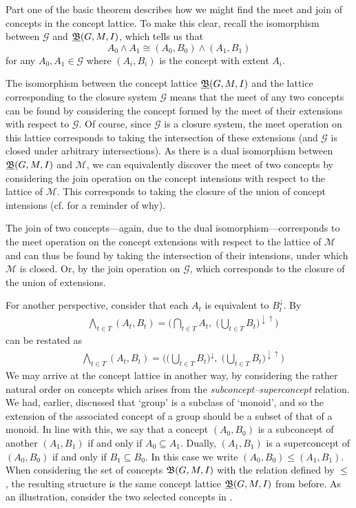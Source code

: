 Part one of the basic theorem describes how we might find the meet and join of concepts in the concept lattice. To make this
clear, recall the isomorphism between $\mathcal{G}$ and $\underline{{\mathfrak B}} (G,M,\mathrel{I})$, which tells us that
\[
	A_{0}\wedge A_{1}\cong (A_{0},B_{0}) \wedge (A_{1},B_{1})
\]
for any $A_{0},A_{1}\in \mathcal{G}$ where $(A_{i},B_{i})$ is the concept with extent $A_{i}$.

The isomorphism between the concept lattice $\underline{{\mathfrak B}} (G,M,\mathrel{I})$ and the lattice corresponding to the closure system $\mathcal{G}$ means
that the meet of any two concepts can be found by considering the concept formed by the meet of their extensions with respect
to $\mathcal{G}$. Of course, since $\mathcal{G}$ is a closure system, the meet operation on this lattice corresponds to
taking the intersection of these extensions (and $\mathcal{G}$ is closed under arbitrary intersections). As there is a dual
isomorphism between $\underline{{\mathfrak B}} (G,M,\mathrel{I})$ and $\mathcal{M}$, we can equivalently discover the meet of two concepts by considering the
join operation on the concept intensions with respect to the lattice of $\mathcal{M}$. This corresponds to taking the closure
of the union of concept intensions (cf.  for a reminder of why).

The join of two concepts---again, due to the dual isomorphism---corresponds to the meet operation on the concept extensions
with respect to the lattice of $\mathcal{M}$ and can thus be found by taking the intersection of their intensions, under
which $\mathcal{M}$ is closed. Or, by the join operation on $\mathcal{G}$, which corresponds to the closure of the union
of extensions.

For another perspective, consider that each $A_{t}$ is equivalent to $B_{t}^{\downarrow}$. By 
\begin{align*}
	 & \underset{t \in T}\bigwedge (A_{t}, B_{t}) = \Big( \underset{t \in T}\bigcap A_{t}, \; \big(\underset{t \in T}\bigcup B_{t}\big)^{\downarrow \uparrow}\Big)
\end{align*}
can be restated as
\begin{align*}
	 & \underset{t \in T}\bigwedge (A_{t}, B_{t}) = \Big(\big(\underset{t \in T}\bigcup B_{t}\big)^{\downarrow}, \; \big(\underset{t \in T}\bigcup B_{t}\big)^{\downarrow \uparrow}\Big)
\end{align*}
We may arrive at the concept lattice in another way, by considering the rather natural order on concepts which arises
from the \textit{subconcept--superconcept} relation. We had, earlier, discussed that `group' is a subclass of `monoid', and
so the extension of the associated concept of a group should be a subset of that of a monoid. In line with this, we say that
a concept $(A_{0},B_{0})$ is a subconcept of another $(A_{1},B_{1})$ if and only if $A_{0}\subseteq A_{1}$. Dually, $(A_{1}
,B_{1})$ is a superconcept of $(A_{0},B_{0})$ if and only if $B_{1}\subseteq B_{0}$. In this case we write
$(A_{0},B_{0}) \leq (A_{1},B_{1})$. When considering the set of concepts ${\mathfrak B} (G,M,\mathrel{I})$ with the relation defined by $\leq$,
the resulting structure is the same concept lattice $\underline{{\mathfrak B}} (G,M,\mathrel{I})$ from before. As an illustration, consider the two selected
concepts in .


